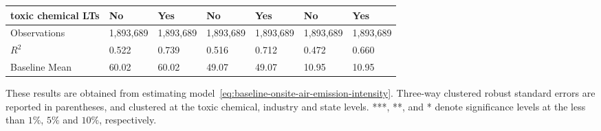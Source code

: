 \begin{table}[H]
{\begin{tabular}{@{}lllllll@{}}
            toxic chemical LTs            & No        & Yes       & No        & Yes       & No        & Yes       \\ \midrule
            Observations                  & 1,893,689 & 1,893,689 & 1,893,689 & 1,893,689 & 1,893,689 & 1,893,689 \\
            $R^2$                         & 0.522     & 0.739     & 0.516     & 0.712     & 0.472     & 0.660     \\
            Baseline Mean                 & 60.02     & 60.02     & 49.07     & 49.07     & 10.95     & 10.95     \\ \bottomrule\bottomrule
        \end{tabular}%
    }
    \begin{minipage}{18cm}
        \vspace{0.05in}
        These results are obtained from estimating model~\ref{eq:baseline-onsite-air-emission-intensity}. Three-way clustered robust standard errors are reported in parentheses, and clustered at the toxic chemical, industry and state levels. ***, **, and * denote significance levels at the less than $1\%$, $5\%$ and $10\%$, respectively.
    \end{minipage}
\end{table}